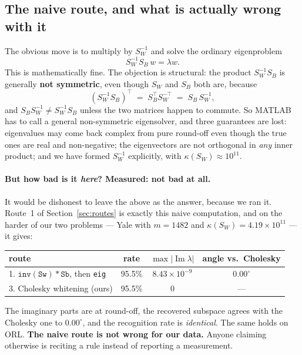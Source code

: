 \documentclass[11pt]{article}
\theoremstyle{definition}
\theoremstyle{remark}
\newcommand{\Sw}{S_W}
\newcommand{\Sb}{S_B}
\begin{document}
\subsection{The naive route, and what is actually wrong with it}
\label{sec:naive}

The obvious move is to multiply by $\Sw^{-1}$ and solve the ordinary eigenproblem
\[
  \Sw^{-1}\Sb\,w = \lambda w .
\]
This is mathematically fine. The objection is structural: the product
$\Sw^{-1}\Sb$ is generally \textbf{not symmetric}, even though $\Sw$ and $\Sb$
both are, because
\[
  (\Sw^{-1}\Sb)^{\!\top} \;=\; \Sb^{\!\top}\Sw^{-\top} \;=\; \Sb\,\Sw^{-1},
\]
and $\Sb\Sw^{-1} \neq \Sw^{-1}\Sb$ unless the two matrices happen to commute.
So MATLAB has to call a general non-symmetric eigensolver, and three guarantees
are lost: eigenvalues may come back complex from pure round-off even though the
true ones are real and non-negative; the eigenvectors are not orthogonal in
\emph{any} inner product; and we have formed $\Sw^{-1}$ explicitly, with
$\kappa(\Sw)\approx 10^{11}$.

\paragraph{But how bad is it \emph{here}? Measured: not bad at all.}
It would be dishonest to leave the above as the answer, because we ran it.
Route~1 of Section~\ref{sec:routes} is exactly this naive computation, and on
the harder of our two problems --- Yale with $m=1482$ and
$\kappa(\Sw)=4.19\times10^{11}$ --- it gives:

\begin{center}
\begin{tabular}{lccc}
\toprule
route & rate & $\max|\operatorname{Im}\lambda|$ & angle vs.\ Cholesky \\
\midrule
1. $\mathtt{inv(Sw)*Sb}$, then \texttt{eig} & 95.5\% & $8.43\times10^{-9}$ & $0.00^\circ$ \\
3. Cholesky whitening (ours)                & 95.5\% & $0$                 & --- \\
\bottomrule
\end{tabular}
\end{center}

The imaginary parts are at round-off, the recovered subspace agrees with the
Cholesky one to $0.00^\circ$, and the recognition rate is \emph{identical}. The
same holds on ORL. \textbf{The naive route is not wrong for our data.} Anyone claiming
otherwise is reciting a rule instead of reporting a measurement.
\end{document}
